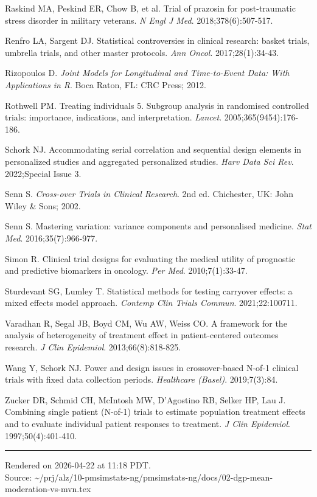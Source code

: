 \documentclass[11pt]{article}
\begin{document}
Raskind MA, Peskind ER, Chow B, et al. Trial of prazosin for
post-traumatic stress disorder in military veterans.
\textit{N Engl J Med}. 2018;378(6):507-517.

Renfro LA, Sargent DJ. Statistical controversies in clinical
research: basket trials, umbrella trials, and other master
protocols. \textit{Ann Oncol}. 2017;28(1):34-43.

Rizopoulos D. \textit{Joint Models for Longitudinal and
Time-to-Event Data: With Applications in R}. Boca Raton, FL:
CRC Press; 2012.

Rothwell PM. Treating individuals 5. Subgroup analysis in
randomised controlled trials: importance, indications, and
interpretation. \textit{Lancet}. 2005;365(9454):176-186.

Schork NJ. Accommodating serial correlation and sequential
design elements in personalized studies and aggregated
personalized studies. \textit{Harv Data Sci Rev}. 2022;Special
Issue 3.

Senn S. \textit{Cross-over Trials in Clinical Research}. 2nd ed.
Chichester, UK: John Wiley \& Sons; 2002.

Senn S. Mastering variation: variance components and
personalised medicine. \textit{Stat Med}. 2016;35(7):966-977.

Simon R. Clinical trial designs for evaluating the medical
utility of prognostic and predictive biomarkers in oncology.
\textit{Per Med}. 2010;7(1):33-47.

Sturdevant SG, Lumley T. Statistical methods for testing
carryover effects: a mixed effects model approach.
\textit{Contemp Clin Trials Commun}. 2021;22:100711.

Varadhan R, Segal JB, Boyd CM, Wu AW, Weiss CO. A framework for
the analysis of heterogeneity of treatment effect in
patient-centered outcomes research. \textit{J Clin Epidemiol}.
2013;66(8):818-825.

Wang Y, Schork NJ. Power and design issues in crossover-based
N-of-1 clinical trials with fixed data collection periods.
\textit{Healthcare (Basel)}. 2019;7(3):84.

Zucker DR, Schmid CH, McIntosh MW, D'Agostino RB, Selker HP,
Lau J. Combining single patient (N-of-1) trials to estimate
population treatment effects and to evaluate individual patient
responses to treatment. \textit{J Clin Epidemiol}. 1997;50(4):401-410.

\vfill
\noindent\rule{\textwidth}{0.4pt}
{\footnotesize
Rendered on 2026-04-22 at 11:18 PDT.\\
Source: \textasciitilde/prj/alz/10-pmsimstats-ng/pmsimstats-ng/docs/02-dgp-mean-moderation-vs-mvn.tex}
\end{document}
